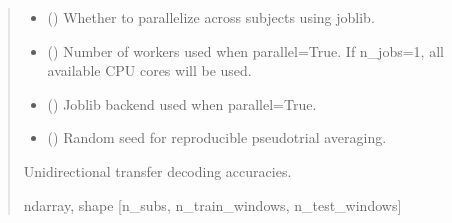 \documentclass[letterpaper,10pt,english]{sphinxhowto}
\begin{document}
\begin{fulllineitems}
\begin{quote}
\begin{description}
\begin{itemize}
\item {} 
\sphinxAtStartPar
{} (\sphinxstyleliteralemphasis{\sphinxupquote{, }}) \textendash{} Whether to parallelize across subjects using joblib.

\item {} 
\sphinxAtStartPar
{} (\sphinxstyleliteralemphasis{\sphinxupquote{, }}) \textendash{} Number of workers used when parallel=True.
If n\_jobs=\sphinxhyphen{}1, all available CPU cores will be used.

\item {} 
\sphinxAtStartPar
{} (\sphinxstyleliteralemphasis{\sphinxupquote{, }}\sphinxstyleliteralemphasis{\sphinxupquote{, }}) \textendash{} Joblib backend used when parallel=True.

\item {} 
\sphinxAtStartPar
{} (\sphinxstyleliteralemphasis{\sphinxupquote{, }}) \textendash{} Random seed for reproducible pseudo\sphinxhyphen{}trial averaging.

\end{itemize}

\sphinxAtStartPar
{} \textendash{} Unidirectional transfer decoding accuracies.

\sphinxAtStartPar
ndarray, shape {[}n\_subs, n\_train\_windows, n\_test\_windows{]}

\end{description}\end{quote}

\end{fulllineitems}


\sphinxstepscope

\clearpage
\end{document}

